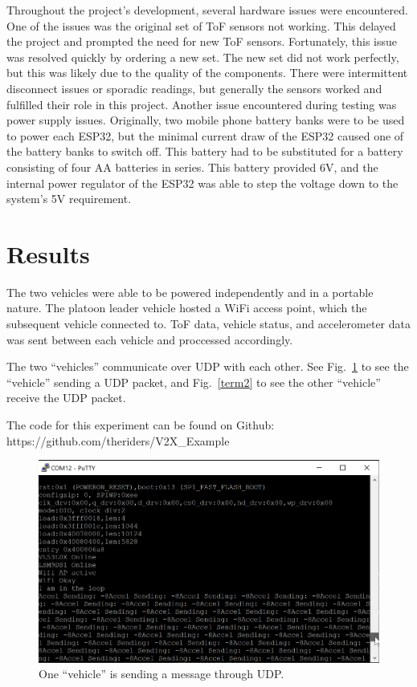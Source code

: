 \documentclass[conference]{IEEEtran}
\begin{document}
Throughout the project's development, several hardware issues were encountered.
One of the issues was the original set of ToF sensors not working.
This delayed the project and prompted the need for new ToF sensors.
Fortunately, this issue was resolved quickly by ordering a new set. The new set
did not work perfectly, but this was likely due to the quality of the components.
There were intermittent disconnect issues or sporadic readings, but generally
the sensors worked and fulfilled their role in this project. Another issue encountered
during testing was power supply issues. Originally, two mobile phone battery banks were
to be used to power each ESP32, but the minimal current draw of the ESP32 caused one
of the battery banks to switch off. This battery had to be substituted for a
battery consisting of four AA batteries in series. This battery provided 6V, and the
internal power regulator of the ESP32 was able to step the voltage down to the system's
5V requirement.

\section{Results}
The two vehicles were able to be powered independently and in a portable nature.
The platoon leader vehicle hosted a WiFi access point, which the subsequent vehicle
connected to. ToF data, vehicle status, and accelerometer data was sent between each
vehicle and proccessed accordingly.

The two ``vehicles'' communicate over UDP with each other. See Fig.~\ref{term1}
to see the ``vehicle'' sending a UDP packet, and Fig.~\ref{term2} to see the
other ``vehicle'' receive the UDP packet.

The code for this experiment can be found on Github:
https://github.com/theriders/V2X\_Example

\begin{figure}[htbp]
\centerline{\includegraphics[width=\linewidth]{pics/term1.png}}
\caption{One ``vehicle'' is sending a message through UDP.}
\label{term1}
\end{figure}
\end{document}
